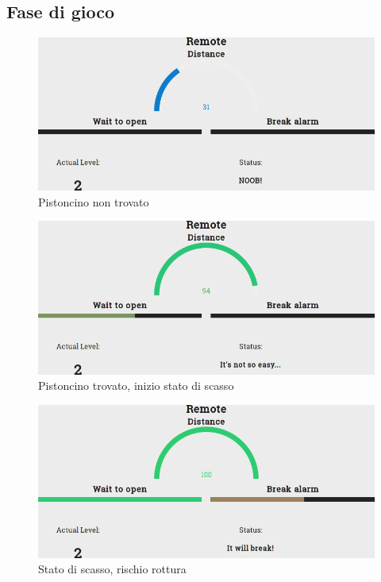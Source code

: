 \clearpage
\subsection{Fase di gioco}
\begin{figure}[!ht]
	\centering
	\includegraphics[scale=.4]{img/testing/game1.png}
	\caption{Pistoncino non trovato}
\end{figure}

\begin{figure}[!ht]
	\centering
	\includegraphics[scale=.4]{img/testing/game2.png}
	\caption{Pistoncino trovato, inizio stato di scasso}
\end{figure}

\begin{figure}[!ht]
	\centering
	\includegraphics[scale=.4]{img/testing/game3.png}
	\caption{Stato di scasso, rischio rottura}
\end{figure}

